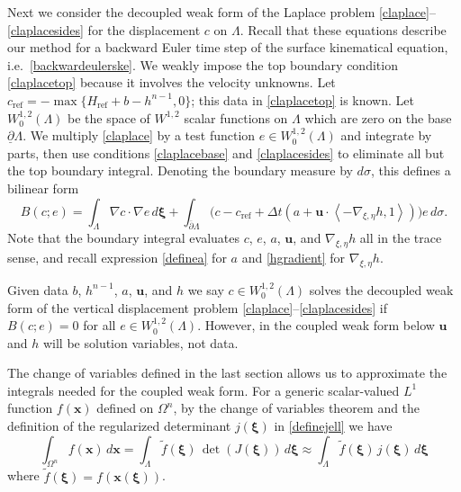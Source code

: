 \documentclass[letterpaper,final,12pt,reqno]{amsart}
\newcommand{\grad}{\nabla}
\newcommand{\bu}{\mathbf{u}}
\newcommand{\bx}{\mathbf{x}}
\newcommand{\bxi}{\bm{\xi}}
\newcommand{\cref}{c_{\text{ref}}}
\newcommand{\Href}{H_{\text{ref}}}
\begin{document}
Next we consider the decoupled weak form of the Laplace problem \eqref{claplace}--\eqref{claplacesides} for the displacement $c$ on $\Lambda$.  Recall that these equations describe our method for a backward Euler time step of the surface kinematical equation, i.e.~\eqref{backwardeulerske}.  We weakly impose the top boundary condition \eqref{claplacetop} because it involves the velocity unknowns.  Let $\cref=-\max\{\Href+b-h^{n-1},0\}$; this data in \eqref{claplacetop} is known.  Let $W_0^{1,2}(\Lambda)$ be the space of $W^{1,2}$ scalar functions on $\Lambda$ which are zero on the base $\underline{\partial} \Lambda$.  We multiply \eqref{claplace} by a test function $e \in W_0^{1,2}(\Lambda)$ and integrate by parts, then use conditions \eqref{claplacebase} and \eqref{claplacesides} to eliminate all but the top boundary integral.  Denoting the boundary measure by $d\sigma$, this defines a bilinear form
\begin{equation}
B(c;e) = \int_\Lambda \grad c \cdot \grad e \,d\bxi + \int_{\overline{\partial} \Lambda} \Big(c - \cref + \Delta t(a + \bu\cdot \left<-\grad_{\xi,\eta} h,1\right>)\Big) e\,d\sigma. \label{defineB}
\end{equation}
Note that the boundary integral evaluates $c$, $e$, $a$, $\bu$, and $\grad_{\xi,\eta} h$ all in the trace sense, and recall expression \eqref{definea} for $a$ and \eqref{hgradient} for $\grad_{\xi,\eta} h$.

Given data $b$, $h^{n-1}$, $a$, $\bu$, and $h$ we say $c \in W_0^{1,2}(\Lambda)$ solves the decoupled weak form of the vertical displacement problem \eqref{claplace}--\eqref{claplacesides} if $B(c;e)=0$ for all $e \in W_0^{1,2}(\Lambda)$.  However, in the coupled weak form below $\bu$ and $h$ will be solution variables, not data.

The change of variables defined in the last section allows us to approximate the integrals needed for the coupled weak form.  For a generic scalar-valued $L^1$ function $f(\bx)$ defined on $\Omega^n$, by the change of variables theorem and the definition of the regularized determinant $j(\bxi)$ in \eqref{definejell} we have
\begin{equation}
\int_{\Omega^n} f(\bx)\,d\bx = \int_\Lambda \tilde f(\bxi) \, \det(J(\bxi))\,d\bxi \approx \int_\Lambda \tilde f(\bxi) \, j(\bxi)\,d\bxi \label{changeintegral}
\end{equation}
where $\tilde f(\bxi) = f(\bx(\bxi))$.
\end{document}
